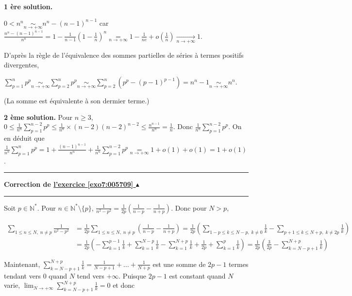 \documentclass[11pt,a4paper]{article}
\newcommand{\Nn}{\mathbb{N}} \newcommand{\N}{\mathbb{N}}
\newcounter{exo}
\newcommand{\correction}[1]{\hypertarget{cor7:#1}{}\label{cor7:#1}{\bf Correction de \hyperlink{exo7:#1}{l'exercice \ref{exo7:#1} $\blacktriangle$}}\vspace{1mm}\hrule\vspace{1mm}}
\newcommand{\fincorrection}{\vspace{1mm}\hrule\vspace*{7mm}}
\begin{document}
\begin{enumerate}
\textbf{1 ère solution.}

$0< n^n\underset{n\rightarrow+\infty}{\sim} n^n - (n-1)^{n-1}$ car $\frac{n^n - (n-1)^{n-1}}{n^n}=  1-\frac{1}{n-1}\left(1-\frac{1}{n}\right)^{n}\underset{n\rightarrow+\infty}{=}1-\frac{1}{ne}+o\left(\frac{1}{n}\right)\underset{n\rightarrow+\infty}{\rightarrow}1$.

D'après la règle de l'équivalence des sommes partielles de séries à termes positifs divergentes,

\begin{center}
$\sum_{p=1}^{n}p^p\underset{n\rightarrow+\infty}{\sim}\sum_{p=2}^{n}p^p\underset{n\rightarrow+\infty}{\sim}\sum_{p=2}^{n}(p^p-(p-1)^{p-1}) = n^n-1\underset{n\rightarrow+\infty}{\sim}n^n$.
\end{center}

(La somme est équivalente à son dermier terme.)

\textbf{2 ème solution.} Pour $n\geqslant3$, $0\leqslant\frac{1}{n^n}\sum_{p=1}^{n-2}p^p\leqslant\frac{1}{n^n}\times(n-2)(n-2)^{n-2}\leqslant \frac{n^{n-1}}{n^n}=\frac{1}{n}$. Donc $\frac{1}{n^n}\sum_{p=1}^{n-2}p^p$. On en déduit que $\frac{1}{n^n}\sum_{p=1}^{n}p^p=1+\frac{(n-1)^{n-1}}{n^n}+\frac{1}{n^n}\sum_{p=1}^{n-2}p^p\underset{n\rightarrow+\infty}{=}1+o(1)+o(1)=1+o(1)$.

\begin{center}
\end{center}
\end{enumerate}
\fincorrection
\correction{005709}
Soit $p\in\Nn^*$. Pour $n\in\Nn^*\setminus\{p\}$, $\frac{1}{n^2-p^2}=\frac{1}{2p}\left(\frac{1}{n-p}-\frac{1}{n+p}\right)$. Donc pour $N > p$,

\begin{align*}
\sum_{1\leqslant n\leqslant N,\;n\neq p}^{}\frac{1}{n^2-p^2}&=\frac{1}{2p}\sum_{1\leqslant n\leqslant N,\;n\neq p}^{}\left(\frac{1}{n-p}-\frac{1}{n+p}\right)=\frac{1}{2p}\left(\sum_{1-p\leqslant k\leqslant N-p,\;k\neq 0}^{}\frac{1}{k}-\sum_{p+1\leqslant k\leqslant N+p,\;k\neq 2p}^{}\frac{1}{k}\right)\\
 &=\frac{1}{2p}\left(-\sum_{k=1}^{p-1}\frac{1}{k}+\sum_{k=1}^{N-p}\frac{1}{k}-\sum_{k=1}^{N+p}\frac{1}{k}+\frac{1}{2p}+\sum_{k=1}^{p}\frac{1}{k}\right)=\frac{1}{2p}\left(\frac{3}{2p}-\sum_{k=N-p+1}^{N+p}\frac{1}{k}\right)
\end{align*}

Maintenant,  $\sum_{k=N-p+1}^{N+p}\frac{1}{k}=\frac{1}{N-p+1}+\ldots+\frac{1}{N+p}$ est une somme de $2p-1$ termes tendant vers $0$ quand $N$ tend vers $+\infty$. Puisque $2p-1$ est constant quand $N$ varie, $\lim_{N \rightarrow +\infty}\sum_{k=N-p+1}^{N+p}\frac{1}{k}=0$ et donc
\end{document}
